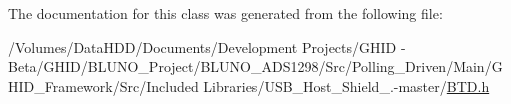\-The documentation for this class was generated from the following file\-:\begin{DoxyCompactItemize}
\item 
/\-Volumes/\-Data\-H\-D\-D/\-Documents/\-Development Projects/\-G\-H\-I\-D -\/ Beta/\-G\-H\-I\-D/\-B\-L\-U\-N\-O\-\_\-\-Project/\-B\-L\-U\-N\-O\-\_\-\-A\-D\-S1298/\-Src/\-Polling\-\_\-\-Driven/\-Main/\-G\-H\-I\-D\-\_\-\-Framework/\-Src/\-Included Libraries/\-U\-S\-B\-\_\-\-Host\-\_\-\-Shield\-\_.-\/master/\hyperlink{_b_t_d_8h}{\-B\-T\-D.\-h}\end{DoxyCompactItemize}

